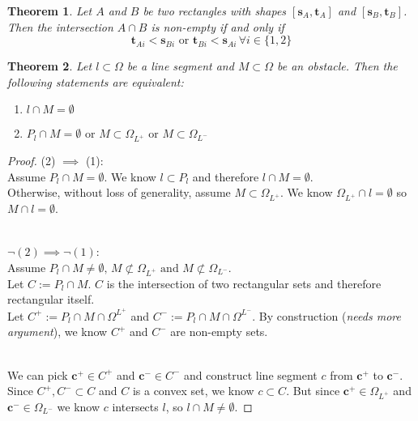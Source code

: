 \documentclass{article}
\renewcommand{\vec}[1]{\mathbf{#1}}
\newtheorem{newthm}{Theorem}
\begin{document}
\begin{newthm}
	Let $A$ and $B$ be two rectangles with shapes $[\vec{s}_A,\vec{t}_A]$ and $[\vec{s}_B,\vec{t}_B]$. Then the intersection $A\cap B$ is non-empty if and only if
	\begin{equation}
		\vec{t}_{Ai} < \vec{s}_{Bi} \mbox{ or }	\vec{t}_{Bi} < \vec{s}_{Ai}\, \forall i \in \{1,2\}
		\label{eq:intersection}
	\end{equation}
	\label{thm:intersect}	
\end{newthm}
\begin{newthm}
	Let $l\subset \Omega$ be a line segment and $M \subset \Omega$ be an obstacle. Then the following statements are equivalent:
		\begin{enumerate}
			\item $l \cap M = \emptyset$
			\item $P_l \cap M = \emptyset \mbox{ or } M \subset \Omega_{L^+} \mbox{ or } M \subset \Omega_{L^-}$
		\end{enumerate}
	\label{thm:sep}
\end{newthm}
\begin{proof}
	(2) $\implies$ (1):\\
	Assume $P_l \cap M = \emptyset$. We know $l \subset P_l$ and therefore $l \cap M = \emptyset$.\\
	Otherwise, without loss of generality, assume $M \subset \Omega_{L^+}$. We know $\Omega_{L^+} \cap l = \emptyset$ so $M \cap l = \emptyset$.

	\ \\
	$\neg (2) \implies \neg (1)$:\\
	Assume $P_l \cap M \neq \emptyset,\, M \not\subset \Omega_{L^+} \mbox{ and } M \not\subset \Omega_{L^-}$.\\
	Let $C := P_l \cap M$. $C$ is the intersection of two rectangular sets and therefore rectangular itself.\\
	Let $C^+:=P_l \cap M \cap \Omega^{L^+}$ and $C^-:= P_l \cap M \cap \Omega^{L^-}$. By construction (\emph{needs more argument}), we know $C^+$ and $C^-$ are non-empty sets.
	
	\ \\
	We can pick $\vec{c}^+ \in C^+$ and $\vec{c}^- \in C^-$ and construct line segment $c$ from $\vec{c}^+$ to $\vec{c}^-$. Since $C^+,C^- \subset C$ and $C$ is a convex set, we know $c \subset C$. But since $\vec{c}^+ \in \Omega_{L^+}$ and $\vec{c}^- \in \Omega_{L^-}$ we know $c$ intersects $l$, so $l \cap M \neq \emptyset$.
\end{proof}
\end{document}
